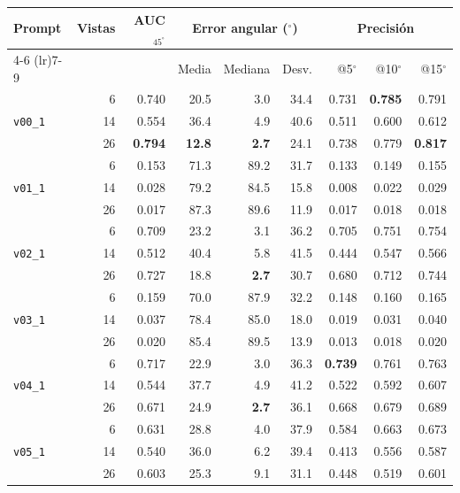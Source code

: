 \begin{table}[H]
\begin{tabular*}{\textwidth}{@{\extracolsep{\fill}}lrrrrrrrr@{}}
\toprule
\multirow{2}{*}{Prompt} & \multirow{2}{*}{Vistas} & \multirow{2}{*}{AUC$_{45^\circ}$} & \multicolumn{3}{c}{Error angular ($^\circ$)} & \multicolumn{3}{c}{Precisión} \\
\cmidrule(lr){4-6} \cmidrule(lr){7-9}
 &  &  & Media & Mediana & Desv. & @5$^\circ$ & @10$^\circ$ & @15$^\circ$ \\
\midrule
\multirow{3}{*}{\texttt{v00\_1}} & 6 & 0.740 & 20.5 & 3.0 & 34.4 & 0.731 & \textbf{0.785} & 0.791 \\
 & 14 & 0.554 & 36.4 & 4.9 & 40.6 & 0.511 & 0.600 & 0.612 \\
 & 26 & \textbf{0.794} & \textbf{12.8} & \textbf{2.7} & 24.1 & 0.738 & 0.779 & \textbf{0.817} \\
\midrule
\multirow{3}{*}{\texttt{v01\_1}} & 6 & 0.153 & 71.3 & 89.2 & 31.7 & 0.133 & 0.149 & 0.155 \\
 & 14 & 0.028 & 79.2 & 84.5 & 15.8 & 0.008 & 0.022 & 0.029 \\
 & 26 & 0.017 & 87.3 & 89.6 & 11.9 & 0.017 & 0.018 & 0.018 \\
\midrule
\multirow{3}{*}{\texttt{v02\_1}} & 6 & 0.709 & 23.2 & 3.1 & 36.2 & 0.705 & 0.751 & 0.754 \\
 & 14 & 0.512 & 40.4 & 5.8 & 41.5 & 0.444 & 0.547 & 0.566 \\
 & 26 & 0.727 & 18.8 & \textbf{2.7} & 30.7 & 0.680 & 0.712 & 0.744 \\
\midrule
\multirow{3}{*}{\texttt{v03\_1}} & 6 & 0.159 & 70.0 & 87.9 & 32.2 & 0.148 & 0.160 & 0.165 \\
 & 14 & 0.037 & 78.4 & 85.0 & 18.0 & 0.019 & 0.031 & 0.040 \\
 & 26 & 0.020 & 85.4 & 89.5 & 13.9 & 0.013 & 0.018 & 0.020 \\
\midrule
\multirow{3}{*}{\texttt{v04\_1}} & 6 & 0.717 & 22.9 & 3.0 & 36.3 & \textbf{0.739} & 0.761 & 0.763 \\
 & 14 & 0.544 & 37.7 & 4.9 & 41.2 & 0.522 & 0.592 & 0.607 \\
 & 26 & 0.671 & 24.9 & \textbf{2.7} & 36.1 & 0.668 & 0.679 & 0.689 \\
\midrule
\multirow{3}{*}{\texttt{v05\_1}} & 6 & 0.631 & 28.8 & 4.0 & 37.9 & 0.584 & 0.663 & 0.673 \\
 & 14 & 0.540 & 36.0 & 6.2 & 39.4 & 0.413 & 0.556 & 0.587 \\
 & 26 & 0.603 & 25.3 & 9.1 & 31.1 & 0.448 & 0.519 & 0.601 \\
\bottomrule
\end{tabular*}


\end{table}
